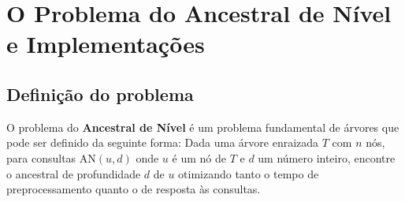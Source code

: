 
\newtheorem{theorem}{Teorema}

\newcommand{\sla}{\textbackslash}

\newcommand{\cmd}[1]{\textsf{#1}}

\newcommand{\pkg}[1]{\textsf{#1}}

\newcommand{\ltxcmd}[1]{\cmd{\sla{}#1}}

\chapter{O Problema do Ancestral de Nível e Implementações}
\label{chap:implementacoes}

\section{Definição do problema}
O problema do \textbf{Ancestral de Nível} é um problema fundamental de árvores que pode
ser definido da seguinte forma: Dada uma árvore enraizada $T$ com $n$ nós, para
consultas $\mathrm{AN}(u, d)$ onde $u$ é um nó de $T$ e $d$ um número inteiro,
encontre o ancestral de profundidade $d$ de $u$ otimizando tanto o tempo de
preprocessamento quanto o de resposta às consultas.


